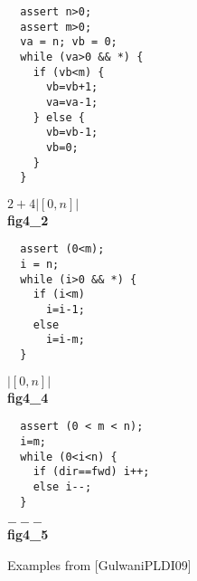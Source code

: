 \documentclass[nocopyrightspace,preprint]{sigplanconf}
\begin{document}
\begin{figure*}[t!]
 \setlength{\progwidth}{.24\linewidth}
  \centering
%
%
  \begin{minipage}[b]{\progwidth}
    \begin{center}
   \begin{lstlisting}
  assert n>0;
  assert m>0;
  va = n; vb = 0;
  while (va>0 && *) {
    if (vb<m) { 
      vb=vb+1; 
      va=va-1;
    } else {
      vb=vb-1;
      vb=0;
    }
  }
   \end{lstlisting}
$2 + 4|[0, n]|$
\\[.7\baselineskip]
      {\bf fig4\_2}
    \end{center}
  \end{minipage}
%
%
%
%
  \begin{minipage}[b]{\progwidth}
    \begin{center}
   \begin{lstlisting}
  assert (0<m);
  i = n;
  while (i>0 && *) {
    if (i<m)
      i=i-1;
    else
      i=i-m;
  }
   \end{lstlisting}
$|[0, n]|$
\\[.7\baselineskip]
      {\bf fig4\_4}
    \end{center}
  \end{minipage}
%
%
  \begin{minipage}[b]{\progwidth}
    \begin{center}
   \begin{lstlisting}
  assert (0 < m < n);
  i=m;
  while (0<i<n) {
    if (dir==fwd) i++;
    else i--;
  }
   \end{lstlisting}
$---$
\\[.7\baselineskip]
      {\bf fig4\_5}
    \end{center}
  \end{minipage}

   \caption{Examples from [GulwaniPLDI09]}
  \label{fig:cat2c}
\end{figure*}
\end{document}
